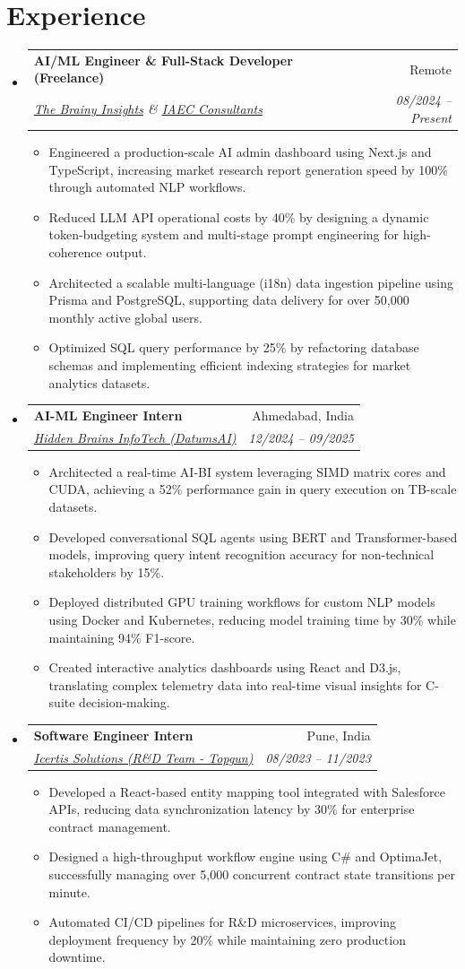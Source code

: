 \documentclass[10pt,a4paper]{article}
\makeatletter
\newcommand{\resumeItem}[1]{\item\small{#1}}
\newcommand{\resumeSubheading}[4]{
  \vspace{-1pt}\item
    \begin{tabular*}{1.0\textwidth}[t]{l@{\extracolsep{\fill}}r}
      \textbf{#1} & #2 \\
      \textit{\small#3} & \textit{\small #4} \\
    \end{tabular*}\vspace{-5pt}
}
\makeatother
\begin{document}
\section{Experience}
\begin{itemize}[label={}]
    \resumeSubheading
      {AI/ML Engineer \& Full-Stack Developer (Freelance)}{Remote}
      {\href{https://thebrainyinsights.com}{The Brainy Insights} \& \href{https://iaec.co.in}{IAEC Consultants}}{08/2024 -- Present}
      \begin{itemize}
        \resumeItem{Engineered a production-scale AI admin dashboard using Next.js and TypeScript, increasing market research report generation speed by 100\% through automated NLP workflows.}
        \resumeItem{Reduced LLM API operational costs by 40\% by designing a dynamic token-budgeting system and multi-stage prompt engineering for high-coherence output.}
        \resumeItem{Architected a scalable multi-language (i18n) data ingestion pipeline using Prisma and PostgreSQL, supporting data delivery for over 50,000 monthly active global users.}
        \resumeItem{Optimized SQL query performance by 25\% by refactoring database schemas and implementing efficient indexing strategies for market analytics datasets.}
      \end{itemize}

    \resumeSubheading
      {AI-ML Engineer Intern}{Ahmedabad, India}
      {\href{https://hiddenbrains.com}{Hidden Brains InfoTech (DatumsAI)}}{12/2024 -- 09/2025}
      \begin{itemize}
        \resumeItem{Architected a real-time AI-BI system leveraging SIMD matrix cores and CUDA, achieving a 52\% performance gain in query execution on TB-scale datasets.}
        \resumeItem{Developed conversational SQL agents using BERT and Transformer-based models, improving query intent recognition accuracy for non-technical stakeholders by 15\%.}
        \resumeItem{Deployed distributed GPU training workflows for custom NLP models using Docker and Kubernetes, reducing model training time by 30\% while maintaining 94\% F1-score.}
        \resumeItem{Created interactive analytics dashboards using React and D3.js, translating complex telemetry data into real-time visual insights for C-suite decision-making.}
      \end{itemize}

    \resumeSubheading
      {Software Engineer Intern}{Pune, India}
      {\href{https://icertis.com}{Icertis Solutions (R\&D Team - Topgun)}}{08/2023 -- 11/2023}
      \begin{itemize}
        \resumeItem{Developed a React-based entity mapping tool integrated with Salesforce APIs, reducing data synchronization latency by 30\% for enterprise contract management.}
        \resumeItem{Designed a high-throughput workflow engine using C\# and OptimaJet, successfully managing over 5,000 concurrent contract state transitions per minute.}
        \resumeItem{Automated CI/CD pipelines for R\&D microservices, improving deployment frequency by 20\% while maintaining zero production downtime.}
      \end{itemize}
\end{itemize}
\end{document}
